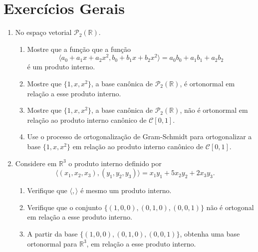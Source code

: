 \section{Exercícios Gerais}
\begin{enumerate}
  \item No espaço vetorial $\mathcal{P}_2(\mathbb{R})$.
    \begin{enumerate}[label=(\alph*)]
      \item  Mostre que a função  que a função $$\langle a_0+a_1x+a_2x^2, b_0+b_1x+b_2x^2 \rangle = a_0b_0+a_1b_1+a_2b_2$$  é um produto interno.
      \item Mostre que $ \{1, x , x^2 \} $, a base canônica de $\mathcal{P}_2(\mathbb{R})$,  é ortonormal em relação a esse produto interno.
      \item Mostre que $ \{1, x , x^2 \} $, a base canônica de $\mathcal{P}_2(\mathbb{R})$,  não é ortonormal em relação ao produto interno canônico de $\mathcal{C}[0,1]$.
      \item Use o processo de ortogonalização de Gram-Schmidt para ortogonalizar a base $ \{1, x , x^2 \} $ em relação ao produto interno canônico de $\mathcal{C}[0,1]$.
    \end{enumerate}

  \item  Considere em  $\mathbb{R}^3$  o produto interno definido por  $$\langle (x_1, x_2,x_3), (y_1, y_2, y_3) \rangle = x_1y_1+5x_2y_2+2x_3y_3 .$$
    \begin{enumerate}
      \item Verifique que $\langle, \rangle $ é mesmo um produto interno.
      \item Verifique que o conjunto  $\{ (1,0,0), (0,1,0), (0,0,1)\}$ não é ortogonal em relação  a esse produto interno.
      \item  A partir da base $\{ (1,0,0), (0,1,0), (0,0,1)\}$,  obtenha uma base ortonormal para $\mathbb{R}^3$, em relação a esse produto interno.
    \end{enumerate}


\end{enumerate}

